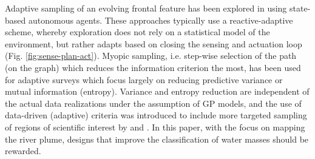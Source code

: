 \documentclass[aoas]{imsart}
\begin{document}
Adaptive sampling of an evolving frontal feature has been explored in
\cite{fronts11,Zhang2012,Pinto2018,costa19} using state-based autonomous
agents. These approaches typically use a reactive-adaptive scheme,
whereby exploration does not rely on a statistical model of the
environment, but rather adapts based on closing the sensing and
actuation loop (Fig. \ref{fig:sense-plan-act}). Myopic sampling, i.e. step-wise selection of the path
(on the graph) which reduces the information criterion the most, has
been used for adaptive surveys \citep{singh2009efficient,Binney2013}
which focus largely on reducing predictive variance or mutual
information (entropy). Variance and entropy reduction are
independent of the actual data realizations under the assumption of GP models, and the use of data-driven (adaptive) criteria was introduced to include more targeted sampling of regions of scientific interest by
\cite{Low2009} and \cite{fossuminformation}.
In this paper, with the focus on mapping the river plume, designs that improve the classification of water masses should be rewarded.




\end{document}
